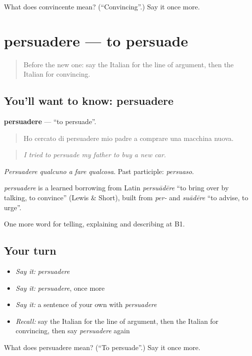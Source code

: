 \begin{tcolorbox}[breakable,colback=teal!4,colframe=teal!35!black,title={Before you move on}]
What does convincente mean? (\textquotedblleft{}Convincing\textquotedblright{}.) Say it once more.
\end{tcolorbox}
\section[persuadere]{persuadere — to persuade}

\label{lesson:IT-C340-persuadere}



\begin{quote}
Before the new one: say the Italian for the line of argument, then the Italian for convincing.
\end{quote}

\subsection*{You'll want to know: persuadere}
\textbf{persuadere} — \textquotedblleft{}to persuade\textquotedblright{}.

\begin{quote}
Ho cercato di persuadere mio padre a comprare una macchina nuova.
\end{quote}

\begin{quote}
\emph{I tried to persuade my father to buy a new car.}
\end{quote}

\emph{Persuadere qualcuno a fare qualcosa}. Past participle: \emph{persuaso}.

\begin{cousinweb}
\emph{persuadere} is a learned borrowing from Latin \emph{persuādēre} \textquotedblleft{}to bring over by talking, to convince\textquotedblright{} (Lewis \& Short), built from \emph{per-} and \emph{suādēre} \textquotedblleft{}to advise, to urge\textquotedblright{}.
\end{cousinweb}

\begin{grammarlens}[title={What you've built}]
One more word for telling, explaining and describing at B1.
\end{grammarlens}

\subsection*{Your turn}
\begin{itemize}
\raggedright
  \item \emph{Say it:} \emph{persuadere}
  \item \emph{Say it:} \emph{persuadere}, once more
  \item \emph{Say it:} a sentence of your own with \emph{persuadere}
  \item \emph{Recall:} say the Italian for the line of argument, then the Italian for convincing, then say \emph{persuadere} again
\end{itemize}

\begin{tcolorbox}[breakable,colback=teal!4,colframe=teal!35!black,title={Before you move on}]
What does persuadere mean? (\textquotedblleft{}To persuade\textquotedblright{}.) Say it once more.
\end{tcolorbox}
